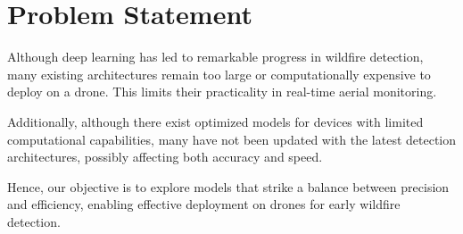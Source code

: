 \section{Problem Statement}
\label{sec:problem-statement}

Although deep learning has led to remarkable progress in wildfire detection, many existing
architectures remain too large or computationally expensive to deploy on a drone.
This limits their practicality in real-time aerial monitoring.

Additionally, although there exist optimized models for devices with limited computational
capabilities, many have not been updated with the latest detection architectures, possibly
affecting both accuracy and speed.

Hence, our objective is to explore models that strike a balance between precision and
efficiency, enabling effective deployment on drones for early wildfire detection.
